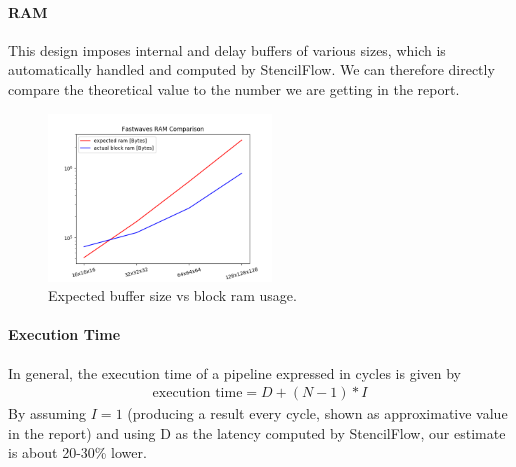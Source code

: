 \paragraph{RAM}
This design imposes internal and delay buffers of various sizes, which is automatically handled and computed by StencilFlow. We can therefore directly compare the theoretical value to the number we are getting in the report.
\begin{figure}[h]
	\centering
	\includegraphics[height=12em]{plots/fastwaves_ram_comparison.png}
	\caption{Expected buffer size vs block ram usage.}
	\label{fig:fastwaves_ram_comparison}
\end{figure}



\paragraph{Execution Time}
In general, the execution time of a pipeline expressed in cycles is given by
\begin{align}
\text{execution time} = D + (N-1)*I
\end{align}
By assuming $I=1$  (producing a result every cycle, shown as approximative value in the report) and using D as the latency computed by StencilFlow, our estimate is about 20-30\% lower.

